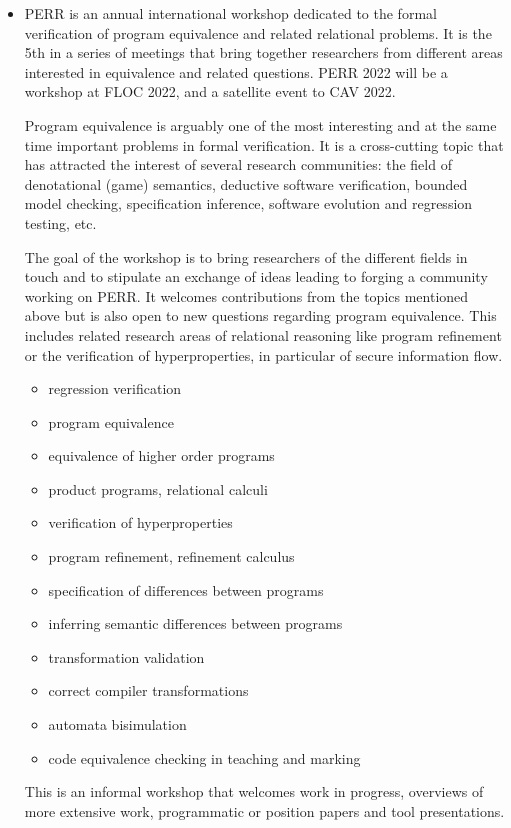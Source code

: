\documentclass[prodmode,acmtecs]{acmsmall} %
\begin{document}
\begin{itemize}\item  PERR is an annual international workshop dedicated to the formal verification of program equivalence and related relational problems. It is the 5th in a series of meetings that bring together researchers from different areas interested in equivalence and related questions. PERR 2022 will be a workshop at FLOC 2022, and a satellite event to CAV 2022. 
 
  Program equivalence is arguably one of the most interesting and at the same time important problems in formal verification. It is a cross-cutting topic that has attracted the interest of several research communities: the field of denotational (game) semantics, deductive software verification, bounded model checking, specification inference, software evolution and regression testing, etc. 
 
  The goal of the workshop is to bring researchers of the different fields in touch and to stipulate an exchange of ideas leading to forging a community working on PERR. It welcomes contributions from the topics mentioned above but is also open to new questions regarding program equivalence. This includes related research areas of relational reasoning like program refinement or the verification of hyperproperties, in particular of secure information flow. 
 
\begin{itemize}\item  regression verification 
\item  program equivalence 
\item  equivalence of higher order programs 
\item  product programs, relational calculi 
\item  verification of hyperproperties 
\item  program refinement, refinement calculus 
\item  specification of differences between programs 
\item  inferring semantic differences between programs 
\item  transformation validation 
\item  correct compiler transformations 
\item  automata bisimulation 
\item  code equivalence checking in teaching and marking
\end{itemize} 
  This is an informal workshop that welcomes work in progress, overviews of more extensive work, programmatic or position papers and tool presentations. 
 

\end{itemize}
\end{document}
